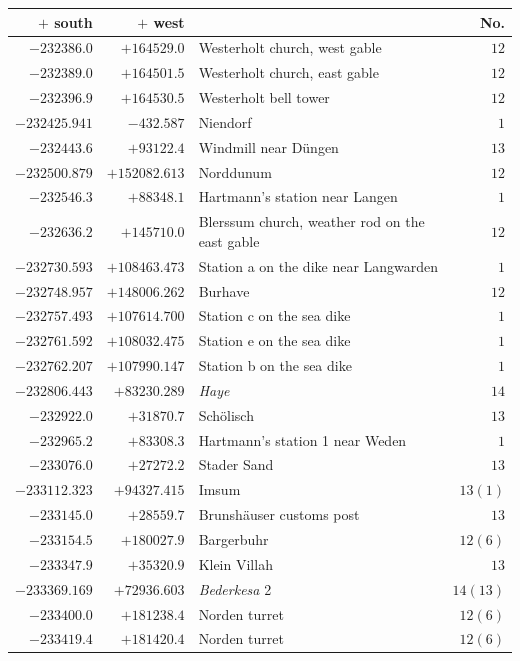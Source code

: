 \clearpage{}%
\begin{center}\begingroup\fontsize{8}{9}\selectfont
\setlength{\tabcolsep}{4pt}
\begin{tabular}{r|r|p{170pt}|r}\hline
\(+\) south&\(+\) west&&No.\\\hline
\(-232386.0\)&\(+164529.0\)&Westerholt church, west gable&\(12\)\\
\(-232389.0\)&\(+164501.5\)&Westerholt church, east gable&\(12\)\\
\(-232396.9\)&\(+164530.5\)&Westerholt bell tower&\(12\)\\
\(-232425.941\)&\(-432.587\)&Niendorf&\(1\)\\
\(-232443.6\)&\(+93122.4\)&Windmill near Düngen&\(13\)\\
\(-232500.879\)&\(+152082.613\)&Norddunum&\(12\)\\
\(-232546.3\)&\(+88348.1\)&Hartmann’s station near Langen&\(1\)\\
\(-232636.2\)&\(+145710.0\)&Blerssum church, weather rod on the east gable&\(12\)\\
\(-232730.593\)&\(+108463.473\)&Station a on the dike near Langwarden&\(1\)\\
\(-232748.957\)&\(+148006.262\)&Burhave&\(12\)\\
\(-232757.493\)&\(+107614.700\)&Station c on the sea dike&\(1\)\\
\(-232761.592\)&\(+108032.475\)&Station e on the sea dike&\(1\)\\
\(-232762.207\)&\(+107990.147\)&Station b on the sea dike&\(1\)\\
\(-232806.443\)&\(+83230.289\)&\textit{Haye}&\(14\)\\
\(-232922.0\)&\(+31870.7\)&Schölisch&\(13\)\\
\(-232965.2\)&\(+83308.3\)&Hartmann’s station 1 near Weden&\(1\)\\
\(-233076.0\)&\(+27272.2\)&Stader Sand&\(13\)\\
\(-233112.323\)&\(+94327.415\)&Imsum&\(13(1)\)\\
\(-233145.0\)&\(+28559.7\)&Brunshäuser customs post&\(13\)\\
\(-233154.5\)&\(+180027.9\)&Bargerbuhr&\(12(6)\)\\
\(-233347.9\)&\(+35320.9\)&Klein Villah&\(13\)\\
\(-233369.169\)&\(+72936.603\)&\textit{Bederkesa} 2&\(14(13)\)\\
\(-233400.0\)&\(+181238.4\)&Norden turret&\(12(6)\)\\
\(-233419.4\)&\(+181420.4\)&Norden turret&\(12(6)\)\\

\end{tabular}
\end{center}

